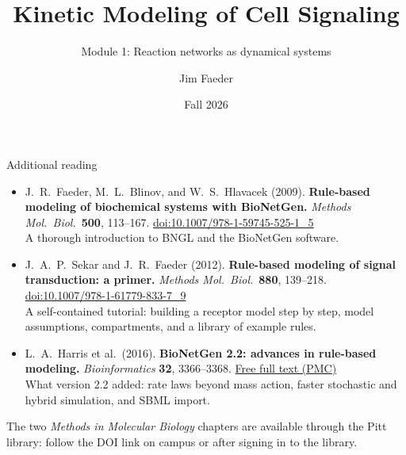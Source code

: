 \documentclass[aspectratio=169,10pt,t]{beamer}
\title{Kinetic Modeling of Cell Signaling}
\subtitle{Module 1: Reaction networks as dynamical systems}
\author{Jim Faeder}
\institute{MSCBIO 2025 \textperiodcentered{} Introduction to Bioinformatics Programming in Python}
\date{Fall 2026}
\begin{document}
\begin{frame}[plain]
  \titlepage
\end{frame}


\newcommand{\bookchapters}{%
  \bookchapter{01-reaction-networks}{1}{Reaction networks as dynamical systems}
  \bookchapter{07-analysis}{7}{Analyzing models (extends the pulse-shape exercise)}}


\begin{frame}{Additional reading}
  \begin{itemize}
    \setlength\itemsep{2mm}
    \item J.~R.~Faeder, M.~L.~Blinov, and W.~S.~Hlavacek (2009).
          \textbf{Rule-based modeling of biochemical systems with BioNetGen.}
          \emph{Methods Mol.\ Biol.}\ \textbf{500}, 113--167.
          \href{https://doi.org/10.1007/978-1-59745-525-1_5}{doi:10.1007/978-1-59745-525-1\_5}\\
          {\small\color{fsGray} A thorough introduction to BNGL and the BioNetGen software.}
    \item J.~A.~P.~Sekar and J.~R.~Faeder (2012).
          \textbf{Rule-based modeling of signal transduction: a primer.}
          \emph{Methods Mol.\ Biol.}\ \textbf{880}, 139--218.
          \href{https://doi.org/10.1007/978-1-61779-833-7_9}{doi:10.1007/978-1-61779-833-7\_9}\\
          {\small\color{fsGray} A self-contained tutorial: building a receptor model step by
          step, model assumptions, compartments, and a library of example rules.}
    \item L.~A.~Harris et al.\ (2016).
          \textbf{BioNetGen 2.2: advances in rule-based modeling.}
          \emph{Bioinformatics} \textbf{32}, 3366--3368.
          \href{https://pmc.ncbi.nlm.nih.gov/articles/PMC5079481/}{Free full text (PMC)}\\
          {\small\color{fsGray} What version 2.2 added: rate laws beyond mass action, faster
          stochastic and hybrid simulation, and SBML import.}
  \end{itemize}
  \vskip1mm
  {\small The two \emph{Methods in Molecular Biology} chapters are available through the
  Pitt library: follow the DOI link on campus or after signing in to the library.}
\end{frame}
\end{document}
